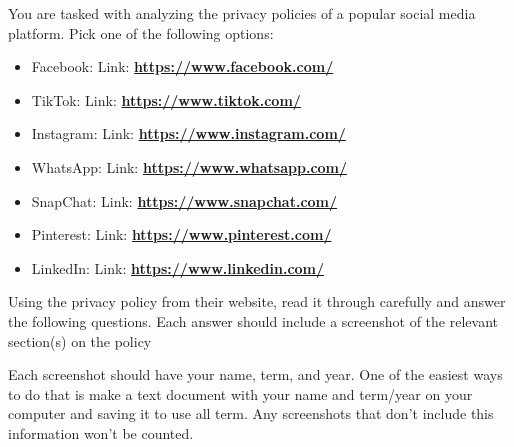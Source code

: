 \documentclass[12pt]{article}
\begin{document}
You are tasked with analyzing the privacy policies of a popular social media platform.  Pick one of the following options: 
        \begin{itemize}
            \item Facebook: Link: \href{https://www.facebook.com/}{\textbf{https://www.facebook.com/}}
            \item TikTok: Link: \href{https://www.tiktok.com/}{\textbf{https://www.tiktok.com/}}
            \item Instagram: Link: \href{https://www.instagram.com/}{\textbf{https://www.instagram.com/}}
            \item WhatsApp: Link: \href{https://www.whatsapp.com/}{\textbf{https://www.whatsapp.com/}}
            \item SnapChat: Link: \href{https://www.snapchat.com/}{\textbf{https://www.snapchat.com/}}
            \item Pinterest: Link: \href{https://www.pinterest.com/}{\textbf{https://www.pinterest.com/}}
            \item LinkedIn: Link: \href{https://www.linkedin.com/}{\textbf{https://www.linkedin.com/}}
    \end{itemize}
        
        

Using the privacy policy from their website, read it through carefully and answer the following questions.  Each answer should include a screenshot of the relevant section(s) on the policy

Each screenshot should have your name, term, and year.  One of the easiest ways to do that is make a text document with your name and term/year on your computer and saving it to use all term. Any screenshots that don't include this information won't be counted.
\end{document}
